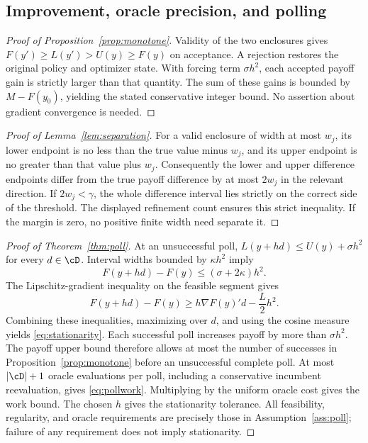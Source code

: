 \subsection{Improvement, oracle precision, and polling}
\begin{proof}[Proof of Proposition~\ref{prop:monotone}]
Validity of the two enclosures gives $F(y')\geq L(y')>U(y)\geq F(y)$ on acceptance. A rejection restores the original policy and optimizer state. With forcing term $\sigma h^2$, each accepted payoff gain is strictly larger than that quantity. The sum of these gains is bounded by $M-F(y_0)$, yielding the stated conservative integer bound. No assertion about gradient convergence is needed.
\end{proof}
\begin{proof}[Proof of Lemma~\ref{lem:separation}]
For a valid enclosure of width at most $w_j$, its lower endpoint is no less than the true value minus $w_j$, and its upper endpoint is no greater than that value plus $w_j$. Consequently the lower and upper difference endpoints differ from the true payoff difference by at most $2w_j$ in the relevant direction. If $2w_j<\gamma$, the whole difference interval lies strictly on the correct side of the threshold. The displayed refinement count ensures this strict inequality. If the margin is zero, no positive finite width need separate it.
\end{proof}
\begin{proof}[Proof of Theorem~\ref{thm:poll}]
At an unsuccessful poll, $L(y+hd)\leq U(y)+\sigma h^2$ for every $d\in\cD$. Interval widths bounded by $\kappa h^2$ imply
\[
 F(y+hd)-F(y)\leq(\sigma+2\kappa)h^2.
\]
The Lipschitz-gradient inequality on the feasible segment gives
\[
 F(y+hd)-F(y)\geq h\nabla F(y)'d-\frac L2h^2.
\]
Combining these inequalities, maximizing over $d$, and using the cosine measure yields \eqref{eq:stationarity}. Each successful poll increases payoff by more than $\sigma h^2$. The payoff upper bound therefore allows at most the number of successes in Proposition~\ref{prop:monotone} before an unsuccessful complete poll. At most $|\cD|+1$ oracle evaluations per poll, including a conservative incumbent reevaluation, gives \eqref{eq:pollwork}. Multiplying by the uniform oracle cost gives the work bound. The chosen $h$ gives the stationarity tolerance. All feasibility, regularity, and oracle requirements are precisely those in Assumption~\ref{ass:poll}; failure of any requirement does not imply stationarity.
\end{proof}

